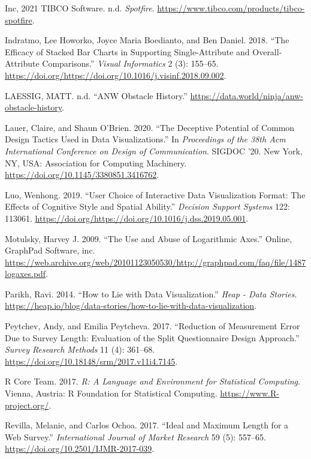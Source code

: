 \documentclass[
  11pt,
]{book}
\begin{document}
\leavevmode\hypertarget{ref-spotfire}{}%
Inc, 2021 TIBCO Software. n.d. \emph{Spotfire}.
\url{https://www.tibco.com/products/tibco-spotfire}.

\leavevmode\hypertarget{ref-INDRATMO2018155}{}%
Indratmo, Lee Howorko, Joyce Maria Boedianto, and Ben Daniel. 2018.
``The Efficacy of Stacked Bar Charts in Supporting Single-Attribute and
Overall-Attribute Comparisons.'' \emph{Visual Informatics} 2 (3):
155--65.
\url{https://doi.org/https://doi.org/10.1016/j.visinf.2018.09.002}.

\leavevmode\hypertarget{ref-ANW}{}%
LAESSIG, MATT. n.d. ``ANW Obstacle History.''
\url{https://data.world/ninja/anw-obstacle-history}.

\leavevmode\hypertarget{ref-claire-obrian}{}%
Lauer, Claire, and Shaun O'Brien. 2020. ``The Deceptive Potential of
Common Design Tactics Used in Data Visualizations.'' In
\emph{Proceedings of the 38th Acm International Conference on Design of
Communication}. SIGDOC '20. New York, NY, USA: Association for Computing
Machinery. \url{https://doi.org/10.1145/3380851.3416762}.

\leavevmode\hypertarget{ref-LUO2019113061}{}%
Luo, Wenhong. 2019. ``User Choice of Interactive Data Visualization
Format: The Effects of Cognitive Style and Spatial Ability.''
\emph{Decision Support Systems} 122: 113061.
\url{https://doi.org/https://doi.org/10.1016/j.dss.2019.05.001}.

\leavevmode\hypertarget{ref-logax}{}%
Motulsky, Harvey J. 2009. ``The Use and Abuse of Logarithmic Axes.''
Online, GraphPad Software, inc.
\url{https://web.archive.org/web/20101123050530/http://graphpad.com/faq/file/1487logaxes.pdf}.

\leavevmode\hypertarget{ref-parikh_2014}{}%
Parikh, Ravi. 2014. ``How to Lie with Data Visualization.'' \emph{Heap -
Data Stories}.
\url{https://heap.io/blog/data-stories/how-to-lie-with-data-visualization}.

\leavevmode\hypertarget{ref-Peytchev_Peytcheva_2017}{}%
Peytchev, Andy, and Emilia Peytcheva. 2017. ``Reduction of Measurement
Error Due to Survey Length: Evaluation of the Split Questionnaire Design
Approach.'' \emph{Survey Research Methods} 11 (4): 361--68.
\url{https://doi.org/10.18148/srm/2017.v11i4.7145}.

\leavevmode\hypertarget{ref-R}{}%
R Core Team. 2017. \emph{R: A Language and Environment for Statistical
Computing}. Vienna, Austria: R Foundation for Statistical Computing.
\url{https://www.R-project.org/}.

\leavevmode\hypertarget{ref-length}{}%
Revilla, Melanie, and Carlos Ochoa. 2017. ``Ideal and Maximum Length for
a Web Survey.'' \emph{International Journal of Market Research} 59 (5):
557--65. \url{https://doi.org/10.2501/IJMR-2017-039}.
\end{document}
